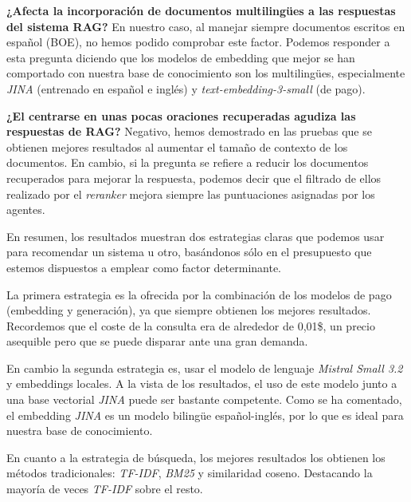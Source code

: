 	   		\noindent\textbf{¿Afecta la incorporación de documentos multilingües a las respuestas del sistema RAG?} En nuestro caso, al manejar siempre documentos escritos en español (BOE), no hemos podido comprobar este factor. Podemos responder a esta pregunta diciendo que los modelos de embedding que mejor se han comportado con nuestra base de conocimiento son los multilingües, especialmente \textit{JINA} (entrenado en español e inglés) y \textit{text-embedding-3-small} (de pago).
	   		
	   		\noindent\textbf{¿El centrarse en unas pocas oraciones recuperadas agudiza las respuestas de RAG?} Negativo, hemos demostrado en las pruebas que se obtienen mejores resultados al aumentar el tamaño de contexto de los documentos. En cambio, si la pregunta se refiere a reducir los documentos recuperados para mejorar la respuesta, podemos decir que el filtrado de ellos realizado por el \textit{reranker} mejora siempre las puntuaciones asignadas por los agentes.
   		
		
			En resumen, los resultados muestran dos estrategias claras que podemos usar para recomendar un sistema u otro, basándonos sólo en el presupuesto que estemos dispuestos a emplear como factor determinante.
			
			\noindent La primera estrategia es la ofrecida por la combinación de los modelos de pago (embedding y generación), ya que siempre obtienen los mejores resultados. Recordemos que el coste de la consulta era de alrededor de 0,01\$, un precio asequible pero que se puede disparar ante una gran demanda. 			
			   			
	   		\noindent En cambio la segunda estrategia es, usar el modelo de lenguaje \textit{Mistral Small 3.2} y embeddings locales. A la vista de los resultados, el uso de este modelo junto a una base vectorial \textit{JINA} puede ser bastante competente. Como se ha comentado, el embedding \textit{JINA} es un modelo bilingüe español-inglés, por lo que es ideal para nuestra base de conocimiento.
   			
   			\noindent En cuanto a la estrategia de búsqueda, los mejores resultados los obtienen los métodos tradicionales: \textit{TF-IDF}, \textit{BM25} y similaridad coseno. Destacando la mayoría de veces \textit{TF-IDF} sobre el resto.

\endgroup